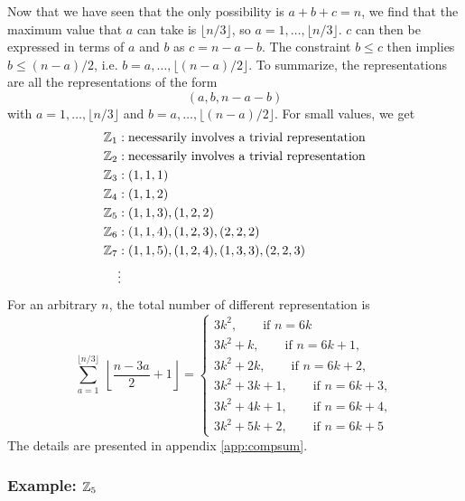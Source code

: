 \documentclass[a4paper,10pt]{article}
\begin{document}
            Now that we have seen that the only possibility is $a+b+c=n$, we find that the maximum value that $a$ can take is $\lfloor n/3\rfloor$, so $a=1,\dots,\lfloor n/3\rfloor$. $c$ can then be expressed in terms of $a$ and $b$ as $c=n-a-b$. The constraint $b\leq c$ then implies $b\leq (n-a)/2$, i.e. $b=a,\dots,\lfloor (n-a)/2\rfloor$. To summarize, the representations are all the representations of the form
            \begin{equation}
                (a,b,n-a-b)
            \end{equation}
            with $a=1,\dots,\lfloor n/3\rfloor$ and $b=a,\dots,\lfloor (n-a)/2\rfloor$. For small values, we get
            \begin{align*}
                \mathbb{Z}_1 &: \text{necessarily involves a trivial representation}\\
                \mathbb{Z}_2 &: \text{necessarily involves a trivial representation}\\
                \mathbb{Z}_3 &: (1,1,1)\\
                \mathbb{Z}_4 &: (1,1,2)\\
                \mathbb{Z}_5 &: (1,1,3),(1,2,2)\label{reprZ5C3}\\
                \mathbb{Z}_6 &: (1,1,4),(1,2,3),(2,2,2)\\
                \mathbb{Z}_7 &: (1,1,5),(1,2,4),(1,3,3),(2,2,3)\\
                &\vdots
            \end{align*}
            For an arbitrary $n$, the total number of different representation is
            \begin{equation}
                \sum^{\lfloor n/3\rfloor}_{a=1}~\left\lfloor \frac{n-3a}{2}+1\right\rfloor = \begin{cases}
                    3k^2,\qquad\text{if $n=6k$}\\
                    3k^2+k,\qquad\text{if $n=6k+1$},\\
                    3k^2+2k,\qquad\text{if $n=6k+2$},\\
                    3k^2+3k+1,\qquad\text{if $n=6k+3$},\\
                    3k^2+4k+1,\qquad\text{if $n=6k+4$},\\
                    3k^2+5k+2,\qquad\text{if $n=6k+5$}
                \end{cases}
            \end{equation}
            The details are presented in appendix \ref{app:compsum}.

        \subsubsection{Example: $\mathbb{Z}_5$}
\end{document}
